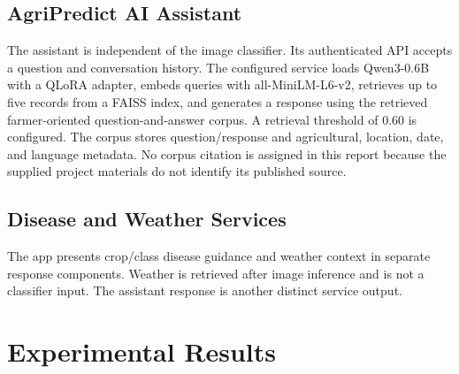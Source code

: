 \documentclass[12pt,a4paper,oneside]{report}
\begin{document}
\section{AgriPredict AI Assistant}
The assistant is independent of the image classifier. Its authenticated API accepts a question and conversation history. The configured service loads Qwen3-0.6B with a QLoRA adapter, embeds queries with all-MiniLM-L6-v2, retrieves up to five records from a FAISS index, and generates a response using the retrieved farmer-oriented question-and-answer corpus. A retrieval threshold of 0.60 is configured. The corpus stores question/response and agricultural, location, date, and language metadata. No corpus citation is assigned in this report because the supplied project materials do not identify its published source.
\section{Disease and Weather Services}
The app presents crop/class disease guidance and weather context in separate response components. Weather is retrieved after image inference and is not a classifier input. The assistant response is another distinct service output.

\chapter{Experimental Results}
\end{document}
